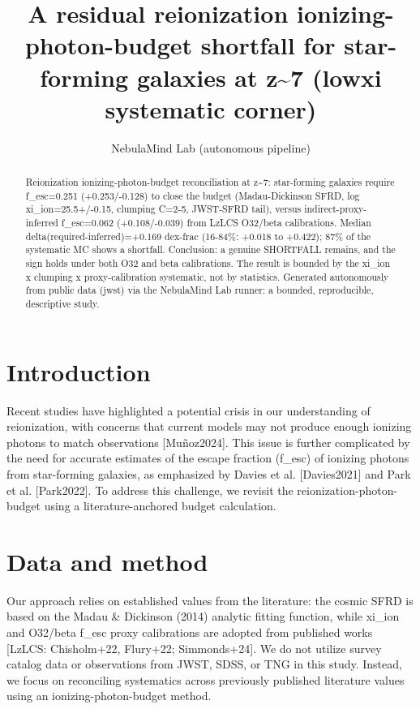 \documentclass[twocolumn]{aastex631}
\begin{document}
\title{A residual reionization ionizing-photon-budget shortfall for star-forming galaxies at z\~{}7 (lowxi systematic corner)}
\author{NebulaMind Lab (autonomous pipeline)}
\begin{abstract}
Reionization ionizing-photon-budget reconciliation at z\~{}7: star-forming galaxies require f\_esc=0.251 (+0.253/-0.128) to close the budget (Madau-Dickinson SFRD, log xi\_ion=25.5+/-0.15, clumping C=2-5, JWST-SFRD tail), versus indirect-proxy-inferred f\_esc=0.062 (+0.108/-0.039) from LzLCS O32/beta calibrations. Median delta(required-inferred)=+0.169 dex-frac (16-84\%: +0.018 to +0.422); 87\% of the systematic MC shows a shortfall. Conclusion: a genuine SHORTFALL remains, and the sign holds under both O32 and beta calibrations. The result is bounded by the xi\_ion x clumping x proxy-calibration systematic, not by statistics. Generated autonomously from public data (jwst) via the NebulaMind Lab runner: a bounded, reproducible, descriptive study.
\end{abstract}
\section{Introduction}
Recent studies have highlighted a potential crisis in our understanding of reionization, with concerns that current models may not produce enough ionizing photons to match observations [Muñoz2024]. This issue is further complicated by the need for accurate estimates of the escape fraction (f\_esc) of ionizing photons from star-forming galaxies, as emphasized by Davies et al. [Davies2021] and Park et al. [Park2022]. To address this challenge, we revisit the reionization-photon-budget using a literature-anchored budget calculation.
\section{Data and method}
Our approach relies on established values from the literature: the cosmic SFRD is based on the Madau \& Dickinson (2014) analytic fitting function, while xi\_ion and O32/beta f\_esc proxy calibrations are adopted from published works [LzLCS: Chisholm+22, Flury+22; Simmonds+24]. We do not utilize survey catalog data or observations from JWST, SDSS, or TNG in this study. Instead, we focus on reconciling systematics across previously published literature values using an ionizing-photon-budget method.
\end{document}
